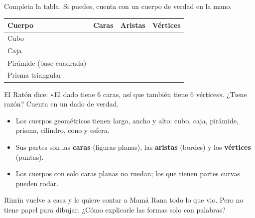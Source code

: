 \documentclass[11pt]{article}
\begin{document}
\begin{preguntas}
\pregunta Completa la tabla. Si puedes, cuenta con un cuerpo de verdad en la
mano.
\begin{center}
{\renewcommand{\arraystretch}{1.8}
\begin{tabular}{|l|c|c|c|}
  \hline
  \textbf{Cuerpo} & \textbf{Caras} & \textbf{Aristas} & \textbf{Vértices}\\\hline
  Cubo                    & \hspace{2cm} & \hspace{2cm} & \hspace{2cm}\\\hline
  Caja                    & & & \\\hline
  Pirámide (base cuadrada) & & & \\\hline
  Prisma triangular        & & & \\\hline
\end{tabular}}
\end{center}

\pregunta El Ratón dice: «El dado tiene 6 caras, así que también tiene 6
vértices». ¿Tiene razón? Cuenta en un dado de verdad.
\end{preguntas}

\begin{resumen}
\begin{itemize}
  \item Los cuerpos geométricos tienen largo, ancho y alto: cubo, caja,
        pirámide, prisma, cilindro, cono y esfera.
  \item Sus partes son las \textbf{caras} (figuras planas), las
        \textbf{aristas} (bordes) y los \textbf{vértices} (puntas).
  \item Los cuerpos con solo caras planas no ruedan; los que tienen partes
        curvas pueden rodar.
\end{itemize}
\end{resumen}

\label{tema:formas}

\begin{hilo}
Rinrín vuelve a casa y le quiere contar a Mamá Rana todo lo que vio. Pero no
tiene papel para dibujar. ¿Cómo explicarle las formas solo con palabras?
\end{hilo}
\end{document}
